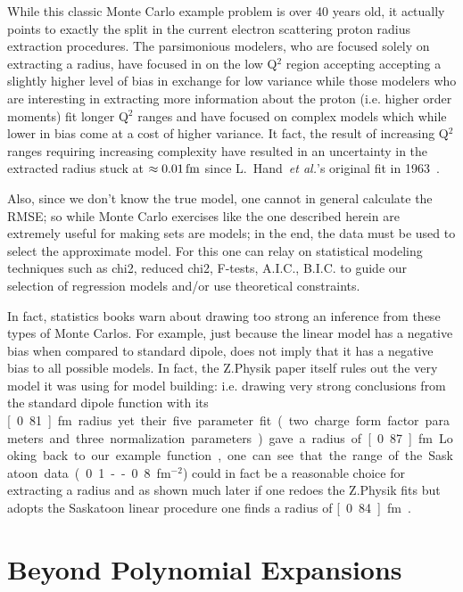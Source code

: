 \documentclass[10pt,aps,prc,twocolumn]{revtex4-1}
\begin{document}
While this classic Monte Carlo example problem is over 40 years old, it actually points to exactly the split in 
the current electron scattering proton radius extraction procedures.     The parsimonious modelers, who are 
focused solely on extracting a radius, have focused in on the low Q$^2$ region accepting accepting a slightly higher 
level of bias in exchange for low variance while those modelers who are interesting in extracting more information 
about the proton (i.e. higher order moments) fit longer Q$^2$ ranges and have
focused on complex models which while lower in bias come at a cost of higher variance.  
It fact, the result of increasing Q$^2$ ranges requiring increasing complexity have resulted in
an uncertainty in the extracted radius 
stuck at $\approx \unit[0.01]{fm}$ since L.~Hand~\textit{et al.}'s original fit in 1963~\cite{Hand:1963zz}.

Also, since we don't know the true model, one cannot in general calculate the RMSE; so while Monte Carlo exercises 
like the one described herein are extremely useful for making sets are models; in the end, the data must be used 
to select the approximate model. 
For this one can relay on statistical modeling techniques such as chi2, reduced chi2, F-tests, A.I.C., B.I.C. 
to guide our selection of regression models and/or use theoretical constraints.

In fact, statistics books warn about drawing too strong an inference from these types of Monte Carlos.   For example,
just because the linear model has a negative bias when compared to standard dipole, does not imply that it has a negative bias
to all possible models.
In fact, the Z.Physik paper itself rules out the very model it was using for model building: i.e. 
drawing very strong conclusions from the standard dipole function with its \unit[0.81]{fm} radius 
yet their five parameter fit (two charge form factor parameters and three normalization parameters)
gave a radius of \unit[0.87]{fm}.

Looking back to our example function, one can see that the range of the 
Saskatoon data (0.1 -- 0.8 fm$^{-2}$) could in fact be a reasonable
choice for extracting a radius and as shown much later if one redoes 
the Z.Physik fits but adopts the Saskatoon linear procedure one finds
a radius of \unit[0.84]{fm}~\cite{Higinbotham:2015rja}.   

\section{Beyond Polynomial Expansions}
\end{document}
